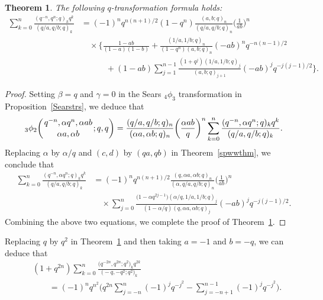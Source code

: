 \documentclass[10pt,a4paper]{amsart}
\numberwithin{equation}{section}
\newtheorem{Theorem}{Theorem}[section]
\begin{document}
\begin{Theorem} \label{watliuthm} The following $q$-transformation formula holds:
	\begin{align*}%
 \sum_{k=0}^n \frac{(q^{-n}, q^n; q)_k q^k}{(q/a, q/b; q)_k}
		&{}=(-1)^n q^{n(n+1)/2} (1-q^n) \frac{(a, b; q)_n}{(q/a, q/b; q)_n}\biggl(\frac{1}{ab}\biggr)^n\nonumber\\
		&\quad{} \times \Biggl\{\frac{1-ab}{(1-a)(1-b)}+\frac{(1/a, 1/b; q)_n}
		{(1-q^n)(a, b; q)_n} (-ab)^n q^{-n(n-1)/2} \nonumber\\
		&\qquad\quad{}+(1-ab)\sum_{j=1}^{n-1} \frac{(1+q^j) (1/a, 1/b; q)_j}{ (a, b; q)_{j+1}} (-ab)^j q^{-j(j-1)/2}\Biggr\}.\nonumber
	\end{align*}		
\end{Theorem}
\begin{proof}
	Setting $\beta=q$ and $\gamma=0$ in the Sears $_4\phi_3$ transformation in Proposition~\ref{Searstrs}, we deduce that
	\begin{equation*}%
		{_3 \phi_2} \biggl({{q^{-n}, \alpha q^n, \alpha ab}
			\atop{\alpha a, \alpha b}}; q, q\biggr)
		=\frac{(q/a, q/b; q)_n}{(\alpha a, \alpha b; q)_n}
		\biggl(\frac{\alpha ab}{q}\biggr)^n
		\sum_{k=0}^n \frac{(q^{-n}, \alpha q^n; q)_k q^k}{(q/a, q/b; q)_k}.
	\end{equation*}
Replacing $\alpha$ by $\alpha/q$ and $(c, d)$ by $(qa, qb)$ in Theorem~\ref{spwwthm}, we conclude that
\begin{align*}%
	\sum_{k=0}^n \frac{(q^{-n}, \alpha q^n; q)_k q^k}{(q/a, q/b; q)_k}
	&{}=(-1)^n q^{n(n+1)/2} \frac{(q, \alpha a, \alpha b; q)_n}{(\alpha, q/a, q/b; q)_n}\biggl(\frac{1}{ab}\biggr)^n\\
	&\quad{}\times \sum_{j=0}^n \frac{\bigl(1-\alpha q^{2j-1}\bigr) (\alpha/q, 1/a, 1/b; q)_j}{(1-\alpha/q) (q, \alpha a, \alpha b; q)_j} (-ab)^j q^{-j(j-1)/2}.\nonumber
\end{align*}	
Combining the above two equations, we complete the proof of Theorem~\ref{watliuthm}.
\end{proof}

Replacing $q$ by $q^2$ in Theorem~\ref{watliuthm} and then taking $a=-1$ and $b=-q$, we can deduce that
\begin{align}
 &(1+q^{2n})	\sum_{k=0}^n \frac{\bigl(q^{-2n}, q^{2n}; q^2\bigr)_k q^{2k}}{\bigl(-q, -q^2; q^2\bigr)_k}\nonumber\\
&\qquad{}=(-1)^n q^{n^2}\Biggl(q^{2n}\sum_{j=-n}^n (-1)^j q^{-j^2}-\sum_{j=-n+1}^{n-1}(-1)^j q^{-j^2}\Biggr).\label{spvalue:eqn11}
\end{align}
\end{document}
